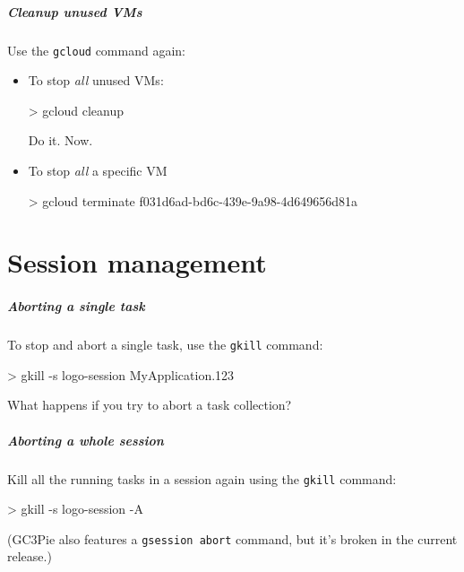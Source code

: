 \documentclass[english,serif,mathserif,usenames,dvipsnames]{beamer}
\begin{document}
\begin{frame}
  \frametitle{Cleanup unused VMs}

  Use the \texttt{gcloud} command again:

  \begin{itemize}
  \item To stop \emph{all} unused VMs:
\begin{semiverbatim}
    > gcloud cleanup
\end{semiverbatim}

    \begin{exercise}
      Do it. Now.
    \end{exercise}

  \item To stop \emph{all} a specific VM
\begin{semiverbatim}
    > gcloud terminate f031d6ad-bd6c-439e-9a98-4d649656d81a
\end{semiverbatim}
  \end{itemize}
\end{frame}


\part{Session management}

\begin{frame}
  \frametitle{Aborting a single task}

  To stop and abort a single task, use the \texttt{gkill} command:
\begin{semiverbatim}
    > gkill -s logo-session MyApplication.123
\end{semiverbatim}

  \pause
  \begin{exercise*}
    What happens if you try to abort a task collection?
  \end{exercise*}
\end{frame}

\begin{frame}
  \frametitle{Aborting a whole session}

  \alert{Kill all the running tasks} in a session again using the
  \texttt{gkill} command:
\begin{semiverbatim}
    > gkill -s logo-session -A
\end{semiverbatim}

  \+ (GC3Pie also features a \texttt{gsession abort} command, but it's
  broken in the current release.)
\end{frame}
\end{document}
